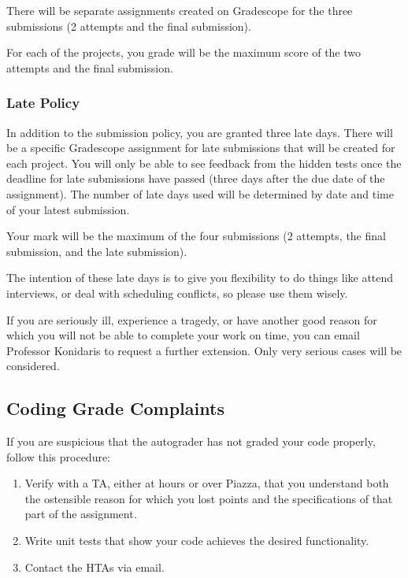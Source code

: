 \documentclass{article}
\begin{document}
There will be separate assignments created on Gradescope for the three submissions (2 attempts and the final submission).

For each of the projects, you grade will be the maximum score of the two attempts and the final submission. 

\subsubsection{Late Policy}
In addition to the submission policy, you are granted three late days. There will be a specific Gradescope assignment for late submissions that will be created for each project. You will only be able to see feedback from the hidden tests once the deadline for late submissions have passed (three days after the due date of the assignment). The number of late days used will be determined by date and time of your latest submission.

Your mark will be the maximum of the four submissions (2 attempts, the final submission, and the late submission). 

The intention of these late days is to give you flexibility to do things like attend interviews, or deal with scheduling conflicts, so please use them wisely.

If you are seriously ill, experience a tragedy, or have another good reason for which you will not be able to complete your work on time, you can email Professor Konidaris to request a further extension.
Only very serious cases will be considered.

\subsection{Coding Grade Complaints}
If you are suspicious that the autograder has not graded your code properly, follow this procedure:
\begin{enumerate}
    \item Verify with a TA, either at hours or over Piazza, that you understand both the ostensible reason for which you lost points and the specifications of that part of the assignment.
    
    \item Write unit tests that show your code achieves the desired functionality.
    
    \item Contact the HTAs via email. 
    
\end{enumerate}
\end{document}

